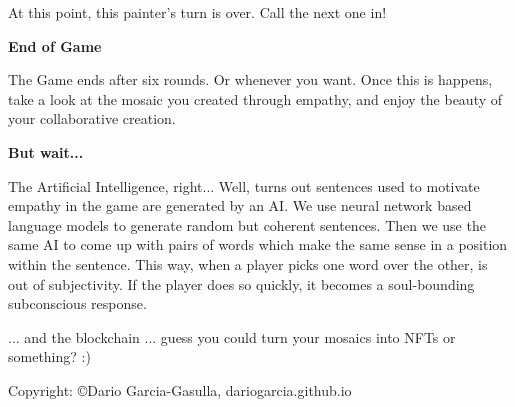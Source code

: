\documentclass[twocolumn]{article}
\newcommand{\lvl}[1]{\vspace{0.5cm}\Large{\textbf{#1}}\vspace{0.2cm}}
\begin{document}
\vspace{0.5cm}At this point, this painter's turn is over. Call the next one in!




\lvl{End of Game}

The Game ends after six rounds. Or whenever you want. Once this is happens, take a look at the mosaic you created through empathy, and enjoy the beauty of your collaborative creation.



\lvl{But wait...}

The Artificial Intelligence, right... Well, turns out sentences used to motivate empathy in the game are generated by an AI. We use neural network based language models to generate random but coherent sentences. Then we use the same AI to come up with pairs of words which make the same sense in a position within the sentence. This way, when a player picks one word over the other, is out of subjectivity. If the player does so quickly, it becomes a soul-bounding subconscious response.

... and the blockchain ... guess you could turn your mosaics into NFTs or something? :)
% 
% 

\vspace{6.5cm}

\small{Copyright: \copyright Dario Garcia-Gasulla, dariogarcia.github.io} \\
\end{document}
